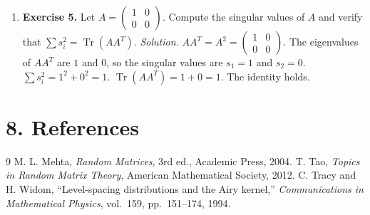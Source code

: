 \begin{enumerate}[leftmargin=*,itemsep=0.9em]
\item \textbf{Exercise 5.} Let $A=\begin{pmatrix}1&0\\0&0\end{pmatrix}$. Compute the singular values of $A$ and verify that $\sum s_i^2=\operatorname{Tr}(AA^T)$. \emph{Solution.} $AA^T=A^2=\begin{pmatrix}1&0\\0&0\end{pmatrix}$. The eigenvalues of $AA^T$ are $1$ and $0$, so the singular values are $s_1=1$ and $s_2=0$. $\sum s_i^2=1^2+0^2=1$. $\operatorname{Tr}(AA^T)=1+0=1$. The identity holds.

\end{enumerate}
\section*{8. References}
\begin{thebibliography}{9}
 M. L. Mehta, \emph{Random Matrices}, 3rd ed., Academic Press, 2004.
 T. Tao, \emph{Topics in Random Matrix Theory}, American Mathematical Society, 2012.
 C. Tracy and H. Widom, ``Level-spacing distributions and the Airy kernel,'' \emph{Communications in Mathematical Physics}, vol.\ 159, pp.\ 151--174, 1994.
\end{thebibliography}
